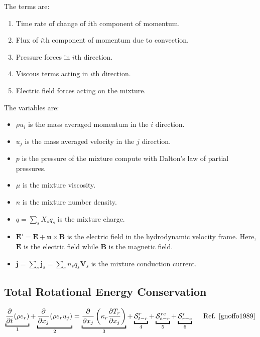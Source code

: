 \documentclass[10pt]{article}
\begin{document}
\begin{flushleft}
The terms are:

\begin{enumerate}
    \item Time rate of change of $i$th component of momentum.
    \item Flux of $i$th component of momentum due to convection.
    \item Pressure forces in $i$th direction.
    \item Viscous terms acting in $i$th direction.
    \item Electric field forces acting on the mixture.
\end{enumerate}

The variables are:

\begin{itemize}
    \item $\rho u_i$ is the mass averaged momentum in the $i$ direction.
    \item $u_j$ is the mass averaged velocity in the $j$ direction.
    \item $p$ is the pressure of the mixture compute with Dalton's law of partial pressures.
    \item $\mu$ is the mixture viscosity.
    \item $n$ is the mixture number density.
    \item $q = \sum_s X_s q_s$ is the mixture charge.
    \item $\boldsymbol{E}' = \boldsymbol{E} + \boldsymbol{u} \times \boldsymbol{B}$ is the electric field in the hydrodynamic velocity frame. Here, $\boldsymbol{E}$ is the electric field while $\boldsymbol{B}$ is the magnetic field.
    \item $\boldsymbol{j} = \sum_s \boldsymbol{j}_s = \sum_s n_s q_s \boldsymbol{V}_s$ is the mixture conduction current.
\end{itemize}

\subsection{Total Rotational Energy Conservation}

\begin{equation*}
    \ub{\pd{}{t} (\rho e_r)}{1} + \ub{\pd{}{x_j} (\rho e_r u_j)}{2} = \ub{\pd{}{x_j} \bp{\kappa_r \pd{T_r}{x_j}}}{3} + \ub{\mathcal{S}_{t-r}^{r}}{4} + \ub{\mathcal{S}_{e-r}^{re}}{5} + \ub{\mathcal{S}_{r-c}^{r}}{6} \hspace{5mm} \text{Ref. \cite{gnoffo1989}}
\end{equation*}


\end{flushleft}
\end{document}
